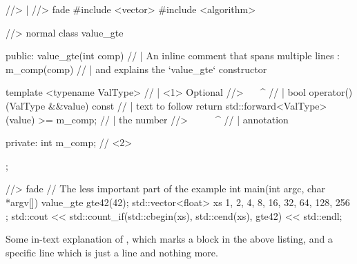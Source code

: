 \documentclass{article}
\begin{document}
\begin{othercoder}
//> |
//> fade
    #include <vector>
    #include <algorithm>

//> normal
    class value_gte {
    public:
        value_gte(int comp)  // | An inline comment that spans multiple lines
            : m_comp(comp)   // | and explains the `value_gte` constructor
        {
        }

        template <typename ValType>                         // | <1> Optional
//>           ^^^^^^^^^^^^^^^^                              // |
        bool operator() (ValType &&value) const {           // | text to follow
            return std::forward<ValType>(value) >= m_comp;  // | the number
//>            ^^^^^^^^^^^^^^^^^^^^^^^^^^^^
        }                                                   // | annotation

    private:
        int m_comp; // <2>
    };

//> fade
    // The less important part of the example
    int main(int argc, char *argv[])
    {
        value_gte gte42(42);
        std::vector<float> xs { 1, 2, 4, 8, 16, 32, 64, 128, 256 };
        std::cout << std::count_if(std::cbegin(xs), std::cend(xs), gte42)
                  << std::endl;
    }
\end{othercoder}

Some in-text explanation of ,
which marks a block in the above listing,
and a specific line 
which is just a line and nothing more.
\end{document}

